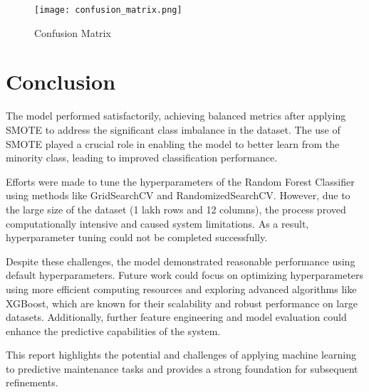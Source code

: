 \documentclass[a4paper,12pt]{article}
\begin{document}
	\begin{figure}[h!]
		\centering
		\texttt{[image: confusion\_matrix.png]} %
		\caption{Confusion Matrix}
		\label{fig:confusion_matrix}
	\end{figure}
	
	
	
\section{Conclusion}
The model performed satisfactorily, achieving balanced metrics after applying SMOTE to address the significant class imbalance in the dataset. The use of SMOTE played a crucial role in enabling the model to better learn from the minority class, leading to improved classification performance.

Efforts were made to tune the hyperparameters of the Random Forest Classifier using methods like GridSearchCV and RandomizedSearchCV. However, due to the large size of the dataset (1 lakh rows and 12 columns), the process proved computationally intensive and caused system limitations. As a result, hyperparameter tuning could not be completed successfully.

Despite these challenges, the model demonstrated reasonable performance using default hyperparameters. Future work could focus on optimizing hyperparameters using more efficient computing resources and exploring advanced algorithms like XGBoost, which are known for their scalability and robust performance on large datasets. Additionally, further feature engineering and model evaluation could enhance the predictive capabilities of the system.

This report highlights the potential and challenges of applying machine learning to predictive maintenance tasks and provides a strong foundation for subsequent refinements.

	
\end{document}
